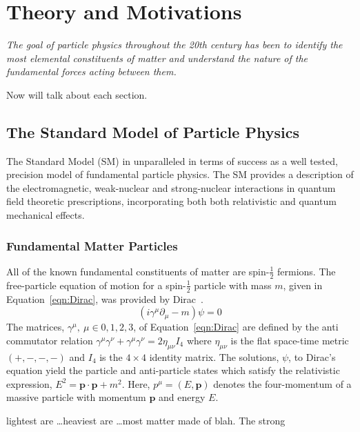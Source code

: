 \chapter{Theory and Motivations}
\label{chap:theory}

\emph{The goal of particle physics throughout the 20th century has been to identify 
the most elemental constituents of matter and understand the nature of
the fundamental forces acting between them.}

Now will talk about each section.

\section{The Standard Model of Particle Physics}

The Standard Model (SM) in unparalleled in terms of success as 
a well tested, precision model of fundamental particle physics. 
The SM provides a description of the electromagnetic, weak-nuclear
and strong-nuclear interactions in quantum field theoretic prescriptions,
incorporating both both relativistic and quantum mechanical effects.

\subsection{Fundamental Matter Particles}
All of the known fundamental constituents of matter
are spin-$\frac{1}{2}$ fermions. 
The free-particle equation of motion for a spin-$\frac{1}{2}$ particle with mass $m$, 
given in Equation~\ref{eqn:Dirac}, was provided by Dirac~\cite{null}.
\begin{equation}
(i\gamma^{\mu}\partial_{\mu} - m)\psi = 0
\end{equation}
The matrices, $\gamma^{\mu},~\mu\in{0,1,2,3}$, of Equation~\ref{eqn:Dirac} are
defined by the anti commutator relation 
$\gamma^{\mu}\gamma^{\nu}+\gamma^{\mu}\gamma^{\nu} = 2\eta_{\mu\nu}I_{4}$ where
$\eta_{\mu\nu}$ is the flat space-time metric $(+,-,-,-)$ and $I_{4}$ is the $4\times4$
identity matrix.
The solutions, $\psi$, to Dirac's equation yield the particle and anti-particle
states which satisfy the relativistic expression, 
$E^{2} = \mathbf{p}\cdot\mathbf{p} + m^{2}$. Here, $p^{\mu} = (E,\mathbf{p})$ 
denotes the four-momentum of a 
massive particle with momentum $\mathbf{p}$ and energy $E$.

lightest are \ldots heaviest are \ldots most matter made of blah.
The strong 
 
